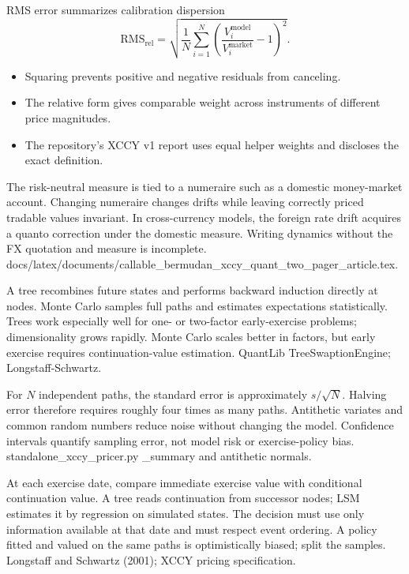 \begin{frame}{RMS error summarizes calibration dispersion}
  \[
  \mathrm{RMS}_{\mathrm{rel}}=
  \sqrt{\frac{1}{N}\sum_{i=1}^{N}
  \left(\frac{V_i^{\mathrm{model}}}{V_i^{\mathrm{market}}}-1\right)^2}.
  \]
  \begin{itemize}\setlength\itemsep{0.8em}
    \item Squaring prevents positive and negative residuals from canceling.
    \item The relative form gives comparable weight across instruments of different price magnitudes.
    \item The repository's XCCY v1 report uses equal helper weights and discloses the exact definition.
  \end{itemize}
\end{frame}

{The risk-neutral measure is tied to a numeraire such as a domestic money-market account.}
{Changing numeraire changes drifts while leaving correctly priced tradable values invariant.}
{In cross-currency models, the foreign rate drift acquires a quanto correction under the domestic measure.}
{Writing dynamics without the FX quotation and measure is incomplete.}
{docs/latex/documents/callable\_bermudan\_xccy\_quant\_two\_pager\_article.tex.}

{A tree recombines future states and performs backward induction directly at nodes.}
{Monte Carlo samples full paths and estimates expectations statistically.}
{Trees work especially well for one- or two-factor early-exercise problems; dimensionality grows rapidly.}
{Monte Carlo scales better in factors, but early exercise requires continuation-value estimation.}
{QuantLib TreeSwaptionEngine; Longstaff-Schwartz.}

{For $N$ independent paths, the standard error is approximately $s/\sqrt{N}$.}
{Halving error therefore requires roughly four times as many paths.}
{Antithetic variates and common random numbers reduce noise without changing the model.}
{Confidence intervals quantify sampling error, not model risk or exercise-policy bias.}
{standalone\_xccy\_pricer.py \_summary and antithetic normals.}

{At each exercise date, compare immediate exercise value with conditional continuation value.}
{A tree reads continuation from successor nodes; LSM estimates it by regression on simulated states.}
{The decision must use only information available at that date and must respect event ordering.}
{A policy fitted and valued on the same paths is optimistically biased; split the samples.}
{Longstaff and Schwartz (2001); XCCY pricing specification.}

